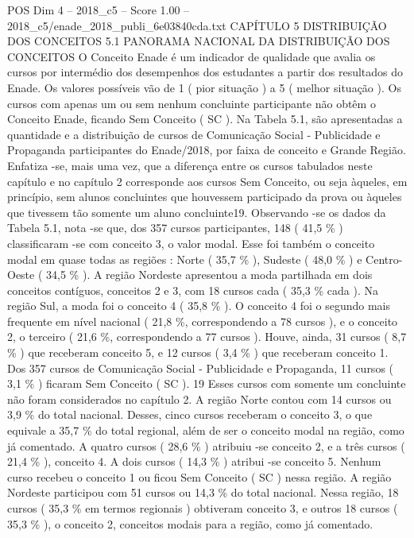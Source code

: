 \begin{textsample}{POS Dim 4 – 2018\_c5 – Score 1.00 – 2018\_c5/enade\_2018\_publi\_6e03840cda.txt}  \label{ex:f4_pos_224}
CAPÍTULO 5 DISTRIBUIÇÃO DOS CONCEITOS 5.1 PANORAMA NACIONAL DA DISTRIBUIÇÃO DOS CONCEITOS O Conceito Enade é um indicador de qualidade que avalia os cursos por intermédio dos desempenhos dos estudantes a partir dos resultados do Enade.
Os valores possíveis vão de 1 ( pior situação ) a 5 ( melhor situação ).
Os cursos com apenas um ou sem nenhum concluinte participante não obtêm o Conceito Enade, ficando Sem Conceito ( SC ).
Na Tabela 5.1, são apresentadas a quantidade e a distribuição de cursos de Comunicação Social - Publicidade e Propaganda participantes do Enade/2018, por faixa de conceito e Grande Região.
Enfatiza -se, mais uma vez, que a diferença entre os cursos tabulados neste capítulo e no capítulo 2 corresponde aos cursos Sem Conceito, ou seja àqueles, em princípio, sem alunos concluintes que houvessem participado da prova ou àqueles que tivessem tão somente um aluno concluinte19.
Observando -se os dados da Tabela 5.1, nota -se que, dos 357 cursos participantes, 148 ( 41,5 \% ) classificaram -se com conceito 3, o valor modal.
Esse foi também o conceito modal em quase todas as regiões : Norte ( 35,7 \% ), Sudeste ( 48,0 \% ) e Centro-Oeste ( 34,5 \% ).
A região Nordeste apresentou a moda partilhada em dois conceitos contíguos, conceitos 2 e 3, com 18 cursos cada ( 35,3 \% cada ).
Na região Sul, a moda foi o conceito 4 ( 35,8 \% ).
O conceito 4 foi o segundo mais frequente em nível nacional ( 21,8 \%, correspondendo a 78 cursos ), e o conceito 2, o terceiro ( 21,6 \%, correspondendo a 77 cursos ).
Houve, ainda, 31 cursos ( 8,7 \% ) que receberam conceito 5, e 12 cursos ( 3,4 \% ) que receberam conceito 1.
Dos 357 cursos de Comunicação Social - Publicidade e Propaganda, 11 cursos ( 3,1 \% ) ficaram Sem Conceito ( SC ). 19 Esses cursos com somente um concluinte não foram considerados no capítulo 2.
A região Norte contou com 14 cursos ou 3,9 \% do total nacional.
Desses, cinco cursos receberam o conceito 3, o que equivale a 35,7 \% do total regional, além de ser o conceito modal na região, como já comentado.
A quatro cursos ( 28,6 \% ) atribuiu -se conceito 2, e a três cursos ( 21,4 \% ), conceito 4.
A dois cursos ( 14,3 \% ) atribui -se conceito 5.
Nenhum curso recebeu o conceito 1 ou ficou Sem Conceito ( SC ) nessa região.
A região Nordeste participou com 51 cursos ou 14,3 \% do total nacional.
Nessa região, 18 cursos ( 35,3 \% em termos regionais ) obtiveram conceito 3, e outros 18 cursos ( 35,3 \% ), o conceito 2, conceitos modais para a região, como já comentado.

\end{textsample}
